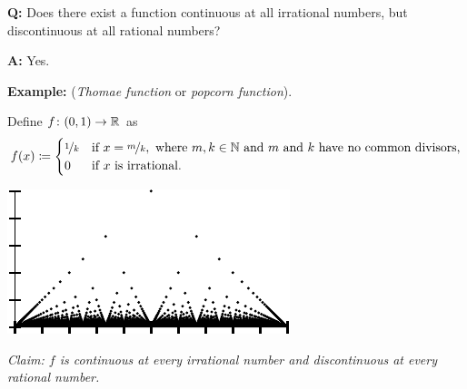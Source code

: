 \documentclass[10pt,aspectratio=169]{beamer}
\begin{document}
\begin{frame}

\textbf{Q:}
Does there exist a function continuous at all irrational numbers, but
discontinuous at all rational numbers?

\pause
\medskip

\textbf{A:} Yes.

\pause
\medskip


\textbf{Example:} (\emph{Thomae function} or \emph{popcorn function}).

Define $f \colon (0,1) \to {\mathbb{R}}$ as
\begin{equation*}
f(x) \coloneqq 
\begin{cases}
\nicefrac{1}{k} & \text{if } x=\nicefrac{m}{k}, \text{ where } m,k \in {\mathbb{N}}
\text{ and } m \text{ and } k \text{ have no common divisors,} \\
0 & \text{if } x \text{ is irrational.}
\end{cases}
\end{equation*}

\begin{center}
\includegraphics{../figures/popcornfig}
\end{center}

\pause
\medskip

\emph{Claim: $f$ is continuous at every irrational number and discontinuous at every
rational number.}

\end{frame}
\end{document}
